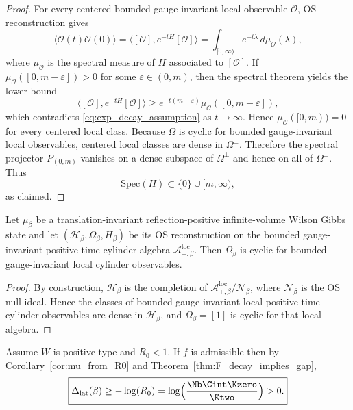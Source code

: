 \begin{proof}
For every centered bounded gauge-invariant local observable $\mathcal O$, OS reconstruction gives
\[
\langle \mathcal O(t)\mathcal O(0)\rangle
=
\langle [\mathcal O],e^{-tH}[\mathcal O]\rangle
=\int_{[0,\infty)} e^{-t\lambda}\,d\mu_{\mathcal O}(\lambda),
\]
where $\mu_{\mathcal O}$ is the spectral measure of $H$ associated to $[\mathcal O]$.
If $\mu_{\mathcal O}([0,m-\varepsilon])>0$ for some $\varepsilon\in(0,m)$, then the spectral theorem yields the lower bound
\[
\langle [\mathcal O],e^{-tH}[\mathcal O]\rangle\ge e^{-t(m-\varepsilon)}\mu_{\mathcal O}([0,m-\varepsilon]),
\]
which contradicts \eqref{eq:exp_decay_assumption} as $t\to\infty$.
Hence $\mu_{\mathcal O}([0,m))=0$ for every centered local class.
Because $\Omega$ is cyclic for bounded gauge-invariant local observables, centered local classes are dense in $\Omega^\perp$.
Therefore the spectral projector $P_{(0,m)}$ vanishes on a dense subspace of $\Omega^\perp$ and hence on all of $\Omega^\perp$.
Thus
\[
\mathrm{Spec}(H)\subset\{0\}\cup[m,\infty),
\]
as claimed.
\end{proof}

\begin{proposition}\label{prop:lattice_OS_cyclicity_local_algebra}
Let $\mu_\beta$ be a translation-invariant reflection-positive infinite-volume Wilson Gibbs state and let $(\mathcal H_\beta,\Omega_\beta,H_\beta)$ be its OS reconstruction on the bounded gauge-invariant positive-time cylinder algebra $\mathcal A_{+,\beta}^{\mathrm{loc}}$.
Then $\Omega_\beta$ is cyclic for bounded gauge-invariant local cylinder observables.
\end{proposition}

\begin{proof}
By construction, $\mathcal H_\beta$ is the completion of $\mathcal A_{+,\beta}^{\mathrm{loc}}/\mathcal N_\beta$, where $\mathcal N_\beta$ is the OS null ideal.
Hence the classes of bounded gauge-invariant local positive-time cylinder observables are dense in $\mathcal H_\beta$, and $\Omega_\beta=[1]$ is cyclic for that local algebra.
\end{proof}

\begin{corollary}\label{cor:gap_from_R0}
Assume $W$ is positive type and $R_0<1$.
If $f$ is admissible then by Corollary~\ref{cor:mu_from_R0} and Theorem~\ref{thm:F_decay_implies_gap},
\begin{equation}\label{eq:gap_bound_R0}
\boxed{\Delta_{\mathrm{lat}}(\beta)\ge -\log(R_0)=\log\Bigl(\frac{\Nb\Cint\Kzero}{\Ktwo}\Bigr)>0.}
\end{equation}
\end{corollary}

